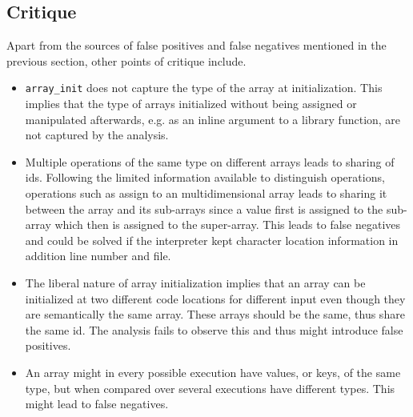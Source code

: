 \subsection{Critique}

Apart from the sources of false positives and false negatives mentioned in the previous section, other points of critique include.
\begin{itemize}
\item \texttt{array\_init} does not capture the type of the array at initialization. This implies that the type of arrays initialized without being assigned or manipulated afterwards, e.g. as an inline argument to a library function, are not captured by the analysis.
\item Multiple operations of the same type on different arrays leads to sharing of ids. Following the limited information available to distinguish operations, operations such as assign to an multidimensional array leads to sharing it between the array and its sub-arrays since a value first is assigned to the sub-array which then is assigned to the super-array. This leads to false negatives and could be solved if the interpreter kept character location information in addition line number and file.   
\item The liberal nature of array initialization implies that an array can be initialized at two different code locations for different input even though they are semantically the same array. These arrays should be the same, thus share the same id. The analysis fails to observe this and thus might introduce false positives. 
\item An array might in every possible execution have values, or keys, of the same type, but when compared over several executions have different types. This might lead to false negatives.
\end{itemize}